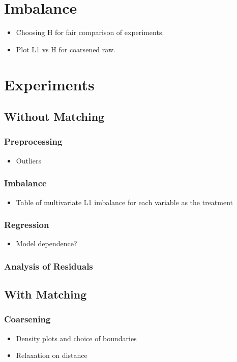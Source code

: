 \section{Imbalance}
\begin{itemize}
    \item Choosing H for fair comparison of experiments.
    \item Plot L1 vs H for coarsened raw.
\end{itemize}

\section{Experiments}

\subsection{Without Matching}
\subsubsection{Preprocessing}
\begin{itemize}
    \item Outliers
\end{itemize}
\subsubsection{Imbalance}
\begin{itemize}
    \item Table of multivariate L1 imbalance for each variable as the treatment
\end{itemize}
\subsubsection{Regression}
\begin{itemize}
    \item Model dependence?
\end{itemize}
\subsubsection{Analysis of Residuals}

\subsection{With Matching}
\subsubsection{Coarsening}
\begin{itemize}
    \item Density plots and choice of boundaries
    \item Relaxation on distance
\end{itemize}
